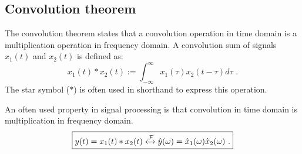 \subsection{Convolution theorem}
The convolution theorem states that a convolution operation in time domain is a multiplication operation in frequency domain. A convolution sum of signals $x_1(t)$ and $x_2(t)$ is defined as:
\begin{equation}
\boxed{
x_1(t)*x_2(t) := \int_{-\infty}^{\infty} x_1(\tau) x_2(t-\tau)d\tau\,\,.
}
\end{equation}
The star symbol ($*$) is often used in shorthand to express this operation.

An often used property in signal processing is that convolution in time domain is multiplication in frequency domain.
\begin{equation}
\boxed{
y(t) =
x_1(t)*x_2(t) \xleftrightarrow{\mathcal{F}} \hat{y}(\omega)=\hat{x}_1(\omega)\hat{x}_2(\omega)\,\,.
}
\end{equation}



